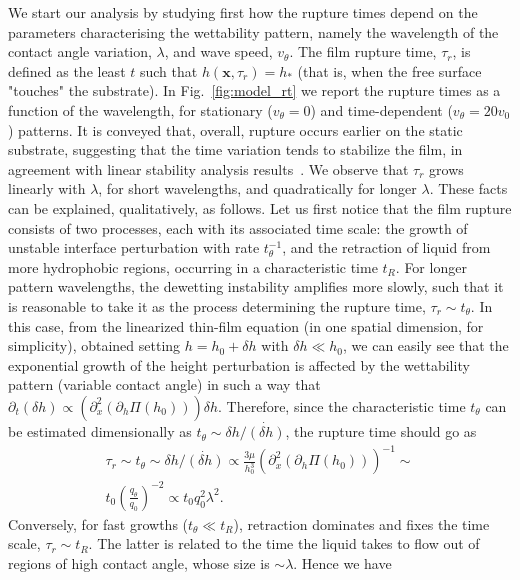 \documentclass[twocolumn,amsmath,amssymb,showpacs,prl,superscriptaddress]{revtex4-1} %
\begin{document}
 We start our analysis by studying first how the rupture times depend on the parameters characterising the wettability pattern, namely the wavelength of the contact angle variation, $\lambda$, and wave speed, $v_{\theta}$.
The film rupture time, $\tau_r$, is defined as the least $t$ such that $h(\mathbf{x},\tau_r)=h_{\ast}$ (that is, when the free surface "touches" the substrate).
In Fig.~\ref{fig:model_rt} we report the rupture times as a function of the wavelength, for stationary ($v_{\theta}=0$) and time-dependent ($v_{\theta}=20 v_0$) patterns. 
It is conveyed that, overall, rupture occurs earlier on the static substrate, suggesting that the time variation tends to stabilize the film, in agreement with linear stability analysis results~\cite{suman2006dynamics}.
We observe that $\tau_r$ grows linearly with $\lambda$, for short wavelengths, and quadratically for longer $\lambda$.
These facts can be explained, qualitatively, as follows. 
Let us first notice that the film rupture consists of two processes, each with its associated time scale: the growth of unstable interface perturbation with rate $t_{\theta}^{-1}$, and the retraction of liquid from more hydrophobic regions, occurring in a characteristic time $t_R$. For longer pattern wavelengths, the dewetting instability amplifies more slowly, such that it is reasonable to take it as the process determining the rupture time, $\tau_r \sim t_{\theta}$.
In this case, from the linearized thin-film equation (in one spatial dimension, for simplicity), obtained setting $h=h_0 + \delta h$ with $\delta h \ll h_0$, 
we can easily see that the exponential growth of the height perturbation is affected by the wettability pattern (variable contact angle) in such a way that $\partial_t (\delta h) \propto (\partial_x^2 (\partial_h\Pi(h_0))) \delta h$. Therefore, since the characteristic time $t_{\theta}$ can be estimated dimensionally as $t_{\theta} \sim \delta h/\dot{(\delta h)}$, the rupture time should go as
\begin{multline}\label{eq:taur_l2}
    \tau_r \sim t_{\theta} \sim  \delta h/\dot{(\delta h)} \propto \frac{3\mu}{h_0^3}(\partial_x^2 (\partial_h\Pi (h_0)))^{-1} \sim \\
    t_0 \left(\frac{q_{\theta}}{q_0}\right)^{-2} \propto t_0 q_0^2 \lambda^2.
\end{multline}
Conversely, for fast growths ($t_{\theta} \ll t_R$), retraction dominates and fixes the time scale, $\tau_r \sim t_R$. 
The latter is related to the time the liquid takes to flow out of regions of high contact angle, whose size is $\sim \lambda$. Hence we have 
\end{document}
